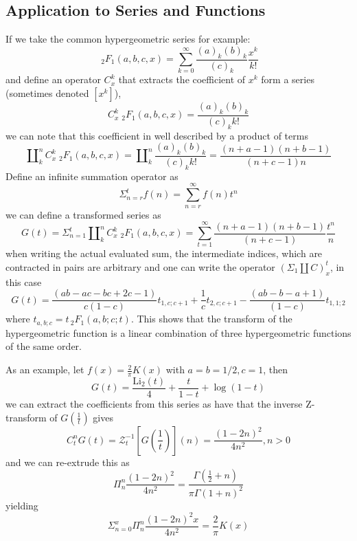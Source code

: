 \documentclass{article}
\begin{document}
\subsection{Application to Series and Functions}
If we take the common hypergeometric series for example:
\begin{equation}
\;_2F_1(a,b,c,x) = \sum_{k=0}^\infty \frac{(a)_k (b)_k}{(c)_k}\frac{x^k}{k!}
\end{equation}
and define an operator $C_x^k$ that extracts the coefficient of $x^k$ form a series (sometimes denoted $[x^k]$),
\begin{equation}
C_x^k \;_2F_1(a,b,c,x) = \frac{(a)_k (b)_k}{(c)_k k!}
\end{equation}
we can note that this coefficient in well described by a product of terms
\begin{equation}
\amalg_k^n C_x^k\;_2F_1(a,b,c,x) = \amalg_k^n \frac{(a)_k (b)_k}{(c)_k k!} = \frac{(n+a-1)(n+b-1)}{(n+c-1)n}
\end{equation}
Define an infinite summation operator as 
\begin{equation}
\Sigma_{n=r}^t f(n) = \sum_{n=r}^\infty f(n) t^n
\end{equation}
we can define a transformed series as \begin{equation}
G(t) = \Sigma_{n=1}^t \amalg_k^n C_x^k\;_2F_1(a,b,c,x)= \sum_{t=1}^\infty \frac{(n+a-1)(n+b-1)}{(n+c-1)}\frac{t^n}{n}
\end{equation}
when writing the actual evaluated sum, the intermediate indices, which are contracted in pairs are arbitrary and one can write the operator $(\Sigma_1\amalg C)_x^t$, in this case
\begin{equation}
G(t) =  \frac{(a b  -a c -b c  +2 c  -1  )}{c(1-c)} t_{1,c;c+1} + \frac{1}{c}t_{2,c;c+1} - \frac{(a b -b -a + 1)}{(1-c)}t_{1,1;2}
\end{equation}
where $t_{a,b;c} = t \, _2F_1(a,b;c;t)$. This shows that the transform of the hypergeometric function is a linear combination of three hypergeometric functions of the same order.


As an example, let $f(x) = \frac{2}{\pi}K(x)$ with $a=b=1/2,c=1$, then $$
G(t) = \frac{\text{Li}_2(t)}{4}+\frac{t}{1-t}+\log (1-t)
$$
we can extract the coefficients from this series as have that the inverse Z-transform of $G(\frac{1}{t})$ gives
$$
C^n_t G(t) = \mathcal{Z}^{-1}_t\left[G\left(\frac{1}{t}\right)\right](n) = \frac{(1-2n)^2}{4n^2}, n>0
$$
and we can re-extrude this as 
$$
\Pi_n^n \frac{(1-2n)^2}{4n^2} = \frac{\Gamma(\frac{1}{2}+n)}{\pi \Gamma(1 + n)^2}
$$
yielding
$$
\Sigma_{n=0}^x \Pi_n^n \frac{(1-2n)^2x}{4n^2} =  \frac{2}{\pi}K(x)
$$
\end{document}
